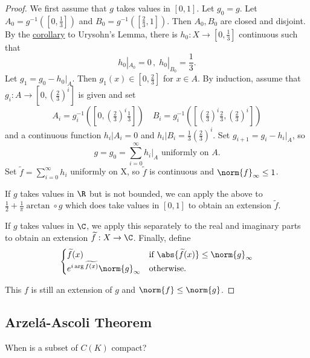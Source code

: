 \documentclass{article}
\begin{document}
\begin{proof}We first assume that $g$ takes values in $[0, 1]$. Let $g_0 = g$.
    Let $A_0 = g^{-1}([0, \frac{1}{3}])$ and $B_0 = g^{-1}([\frac{2}{3}, 1])$. Then $A_0, B_0$ are closed and disjoint.
    By the \hyperlink{cor:urysohnCor}{corollary} to Urysohn's Lemma, there is $h_0: X \to [0, \frac{1}{3}]$ continuous such that
    \begin{equation*}
        h_0|_{A_0} = 0 \, , \; h_0|_{B_0} = \frac{1}{3}.
    \end{equation*}
    Let $g_1 = g_0 - h_0|_A$. Then $g_1(x) \in [0, \frac{2}{3}]$ for $x \in A$.
    By induction, assume that $g_i: A \to [0, (\frac{2}{3})^i]$ is given and set
    \begin{equation*}
        A_i = g_i^{-1} \left(\left[0, \left(\tfrac{2}{3}\right)^i \tfrac{1}{3}\right]\right) \quad B_i = g_i^{-1} \left(\left[\left(\tfrac{2}{3}\right)^i \tfrac{2}{3}, \left(\tfrac{2}{3}\right)^i \right]\right)
    \end{equation*}
    and a continuous function $h_i|A_i = 0$ and $h_i|B_i = \frac{1}{3} (\frac{2}{3})^i$. Set $g_{i+1} = g_i - h_i|_A$, so
    \begin{equation*}
        g = g_0 = \sum_{i=0}^\infty h_i|_A \text{ uniformly on } A.
    \end{equation*}
    Set $\widetilde{f} = \sum_{i=0}^\infty h_i$ uniformly on X, so $\widetilde{f}$ is continuous and $\norm{f}_\infty \leq 1$.

    If $g$ takes values in $\R$ but is not bounded, we can apply the above to $\frac{1}{2} + \frac{1}{\pi} \arctan \circ g$ which does take values in $[0, 1]$ to obtain an extension $\widetilde{f}$.

    If $g$ takes values in $\C$, we apply this separately to the real and imaginary parts to obtain an extension $\widetilde{f}:X \to \C$.
    Finally, define
    \begin{equation*}
        \begin{cases}
            \widetilde{f}(x) & \text{if } \abs{\widetilde{f}(x)} \leq \norm{g}_\infty \\
            e^{i \arg \widetilde{f(x)}} \norm{g}_\infty & \text{otherwise.}
        \end{cases}
    \end{equation*}

    This $f$ is still an extension of $g$ and $\norm{f} \leq \norm{g}$.
\end{proof}

\subsection{Arzel\'a-Ascoli Theorem}
When is a subset of $C(K)$ compact?
\end{document}
